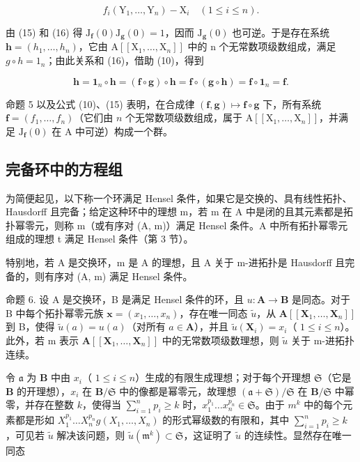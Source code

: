 \[
f _ {i} (\mathrm{Y} _ {1}, \dots , \mathrm{Y} _ {n}) - \mathrm{X} _ {i} \quad (1 \leqslant i \leqslant n).
\]

由 (15) 和 (16) 得 \(\mathrm{J}_{\mathbf{f}}(0)\mathrm{J}_{\mathbf{g}}(0)=1\)，因而 \(\mathrm{J}_{\mathbf{g}}(0)\) 也可逆。于是存在系统 \(\mathbf{h}=(h_{1},\ldots,h_{n})\)，它由 \(\mathrm{A}[[\mathrm{X}_{1},\ldots,\mathrm{X}_{n}]]\) 中的 n 个无常数项级数组成，满足 \(g\circ h=1_{n}\)；由此关系和 (16)，借助 (10)，得到

\[
\mathbf {h} = \mathbf {1} _ {n} \circ \mathbf {h} = (\mathbf {f} \circ \mathbf {g}) \circ \mathbf {h} = \mathbf {f} \circ (\mathbf {g} \circ \mathbf {h}) = \mathbf {f} \circ \mathbf {1} _ {n} = \mathbf {f}.
\]

命题 5 以及公式 (10)、(15) 表明，在合成律 \((\mathbf{f},\mathbf{g})\mapsto \mathbf{f}\circ \mathbf{g}\) 下，所有系统 \(\mathbf{f} = (f_1,\dots ,f_n)\)（它们由 \(n\) 个无常数项级数组成，属于 \(\mathrm{A}[[\mathrm{X}_1,\dots ,\mathrm{X}_n]]\)，并满足 \(\mathrm{J}_{\mathbf{f}}(0)\) 在 A 中可逆）构成一个群。

\subsection{完备环中的方程组}

为简便起见，以下称一个环满足 Hensel 条件，如果它是交换的、具有线性拓扑、Hausdorff 且完备；给定这种环中的理想 m，若 m 在 A 中是闭的且其元素都是拓扑幂零元，则称 m（或有序对 (A, m)）满足 Hensel 条件。A 中所有拓扑幂零元组成的理想 t 满足 Hensel 条件（第 3 节）。

特别地，若 A 是交换环，m 是 A 的理想，且 A 关于 m-进拓扑是 Hausdorff 且完备的，则有序对 (A, m) 满足 Hensel 条件。

命题 6. 设 A 是交换环，B 是满足 Hensel 条件的环，且 \(u: \mathbf{A} \to \mathbf{B}\) 是同态。对于 B 中每个拓扑幂零元族 \(\mathbf{x} = (x_1, \ldots, x_n)\)，存在唯一同态 \(\tilde{u}\)，从 \(\mathbf{A}[[\mathbf{X}_1, \ldots, \mathbf{X}_n]]\) 到 B，使得 \(\tilde{u}(a) = u(a)\)（对所有 \(a \in \mathbf{A}\)），并且 \(\tilde{u}(\mathbf{X}_i) = x_i\)（ \(1 \leqslant i \leqslant n\)）。此外，若 m 表示 \(\mathbf{A}[[\mathbf{X}_1, \ldots, \mathbf{X}_n]]\) 中的无常数项级数理想，则 \(\tilde{u}\) 关于 m-进拓扑连续。

令 \(\mathfrak{a}\) 为 \(\mathbf{B}\) 中由 \(x_{i}\)（ \(1 \leqslant i \leqslant n\)）生成的有限生成理想；对于每个开理想 \(\mathfrak{S}\)（它是 \(\mathbf{B}\) 的开理想），\(x_{i}\) 在 \(\mathbf{B}/\mathfrak{S}\) 中的像都是幂零元，故理想 \((\mathfrak{a} + \mathfrak{S})/\mathfrak{S}\) 在 \(\mathbf{B}/\mathfrak{S}\) 中幂零，并存在整数 \(k\)，使得当 \(\sum_{i=1}^{n} p_{i} \geqslant k\) 时，\(x_{1}^{p_{1}} \ldots x_{n}^{p_{n}} \in \mathfrak{S}\)。由于 \(m^{k}\) 中的每个元素都是形如 \(X_{1}^{p_{1}} \ldots X_{n}^{p_{n}} g(X_{1}, \ldots, X_{n})\) 的形式幂级数的有限和，其中 \(\sum_{i=1}^{n} p_{i} \geqslant k\)，可见若 \(\tilde{u}\) 解决该问题，则 \(\tilde{u}(\mathfrak{m}^k) \subset \mathfrak{S}\)，这证明了 \(\tilde{u}\) 的连续性。显然存在唯一同态

